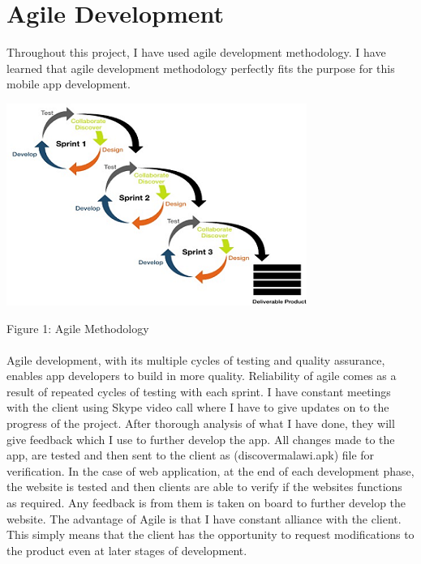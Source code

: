 \section{Agile Development}
Throughout this project, I have used agile development methodology. I have learned that agile development methodology perfectly fits the purpose for this mobile app development.

\begin{center}    
	\includegraphics{img/agile.png}
\end{center}
\begin{center}
	Figure 1: Agile Methodology
\end{center}

\paragraph{}
Agile development, with its multiple cycles of testing and quality assurance, enables app developers to build in more quality. Reliability of agile comes as a result of repeated cycles of testing with each sprint. I have constant meetings with the client using Skype video call where I have to give updates on to the progress of the project. After thorough analysis of what I have done, they will give feedback which I use to further develop the app. All changes made to the app, are tested and then sent to the client as (discovermalawi.apk) file for verification.  In the case of web application, at the end of each development phase, the website is tested and then clients are able to verify if the websites functions as required. Any feedback is from them is taken on board to further develop the website. 
The advantage of Agile is that I have constant alliance with the client. This simply means that the client has the opportunity to request modifications to the product even at later stages of development.

